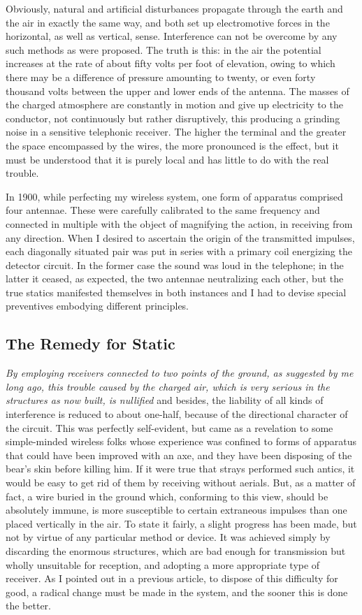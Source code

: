 \documentclass[a4paper,12pt,english,twoside,openright]{memoir}
\begin{document}
 Obviously, natural and artificial disturbances propagate through 
the earth and the air in exactly the same way, and both set up electromotive forces in the 
horizontal, as well as vertical, sense.  Interference can not be overcome by any such methods as 
were proposed.  The truth is this: in the air the potential increases at the rate of about fifty volts 
per foot of elevation, owing to which there may be a difference of pressure amounting to twenty, 
or even forty thousand volts between the upper and lower ends of the antenna.  The masses of 
the charged atmosphere are constantly in motion and give up electricity to the conductor, not 
continuously but rather disruptively, this producing a grinding noise in a sensitive telephonic 
receiver.  The higher the terminal and the greater the space encompassed by the wires, the more 
pronounced is the effect, but it must be understood that it is purely local and has little to do with 
the real trouble.  

In 1900, while perfecting my wireless system, one form of apparatus comprised four antennae.  
These were carefully calibrated to the same frequency and connected in multiple with the object 
of magnifying the action, in receiving from any direction.  When I desired to ascertain the origin of 
the transmitted impulses, each diagonally situated pair was put in series with a primary coil 
energizing the detector circuit.  In the former case the sound was loud in the telephone; in the 
latter it ceased, as expected, the two antennae neutralizing each other, but the true statics 
manifested themselves in both instances and I had to devise special preventives embodying 
different principles.  

\subsection{The Remedy for Static}
\emph{By employing receivers connected to two points of the ground, as suggested by me long ago, this 
trouble caused by the charged air, which is very serious in the structures as now built, is nullified} 
and besides, the liability of all kinds of interference is reduced to about one-half, because of the 
directional character of the circuit.  This was perfectly self-evident, but came as a revelation to 
some simple-minded wireless folks whose experience was confined to forms of apparatus that 
could have been improved with an axe, and they have been disposing of the bear's skin before 
killing him.  If it were true that strays performed such antics, it would be easy to get rid of them by 
receiving without aerials.  But, as a matter of fact, a wire buried in the ground which, conforming 
to this view, should be absolutely immune, is more susceptible to certain extraneous impulses 
than one placed vertically in the air.  To state it fairly, a slight progress has been made, but not by 
virtue of any particular method or device.  It was achieved simply by discarding the enormous 
structures, which are bad enough for transmission but wholly unsuitable for reception, and 
adopting a more appropriate type of receiver.  As I pointed out in a previous article, to dispose of 
this difficulty for good, a radical change must be made in the system, and the sooner this is done 
the better.  
\end{document}
